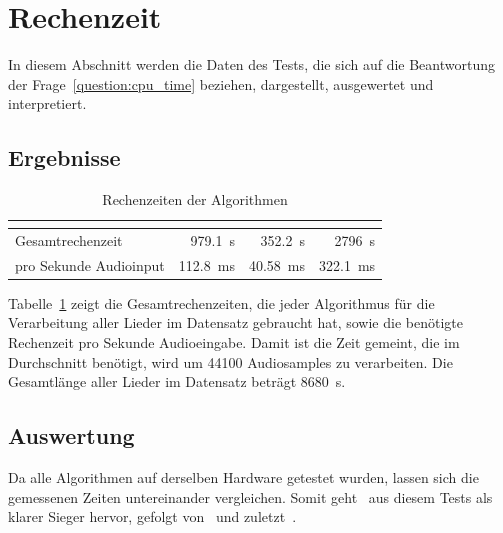 \section{Rechenzeit}
{
	In diesem Abschnitt werden die Daten des Tests,
		die sich auf die Beantwortung der Frage~\ref{question:cpu_time} beziehen,
 		dargestellt, ausgewertet und interpretiert.

	\subsection{Ergebnisse}
	{
		\begin{table}[h]
			\centering
			\begin{tabular}{l | r | r | r}
				                       & \cite{2001_BeatThis} & \cite{2009_DaPlSt}   & \cite{2011_PlRoSt} \\
				\hline \hline
				Gesamtrechenzeit       & \SI{979.1}{\second}  & \SI{352.2}{\second} & \SI{2796}{\second} \\
				pro Sekunde Audioinput & \SI{112.8}{\milli\second} & \SI{40.58}{\milli\second} & \SI{322.1}{\milli\second}
			\end{tabular}
			\caption{Rechenzeiten der Algorithmen}
			\label{tab:cputime}
		\end{table}

		Tabelle~\ref{tab:cputime} zeigt die Gesamtrechenzeiten,
			die jeder Algorithmus für die Verarbeitung aller Lieder im Datensatz gebraucht hat,
			sowie die benötigte Rechenzeit pro Sekunde Audioeingabe.
		Damit ist die Zeit gemeint,
			die im Durchschnitt benötigt,
			wird um \num{44100} Audiosamples zu verarbeiten.
		Die Gesamtlänge aller Lieder im Datensatz beträgt \SI{8680}{\second}.
	}

	\subsection{Auswertung}
	{
		Da alle Algorithmen auf derselben Hardware getestet wurden,
			lassen sich die gemessenen Zeiten untereinander vergleichen.
		Somit geht~\cite{2009_DaPlSt} aus diesem Tests als klarer Sieger hervor,
			gefolgt von~\cite{2001_BeatThis} und zuletzt~\cite{2011_PlRoSt}.

}}
